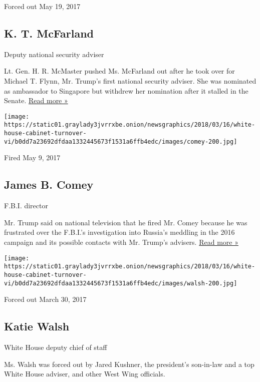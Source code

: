 Forced out May 19, 2017

\hypertarget{k-t-mcfarland}{%
\subsection{K. T. McFarland}\label{k-t-mcfarland}}

Deputy national security adviser

Lt. Gen. H. R. McMaster pushed Ms. McFarland out after he took over for
Michael T. Flynn, Mr. Trump's first national security adviser. She was
nominated as ambassador to Singapore but withdrew her nomination after
it stalled in the Senate.
\href{https://www.nytimes3xbfgragh.onion/2018/02/02/us/politics/kt-mcfarland-nomination-ambassador.html}{Read
more »}

\texttt{[image: https://static01.graylady3jvrrxbe.onion/newsgraphics/2018/03/16/white-house-cabinet-turnover-vi/b0dd7a23692dfdaa1332445673f1531a6ffb4edc/images/comey-200.jpg]}

Fired May 9, 2017

\hypertarget{james-b-comey}{%
\subsection{James B. Comey}\label{james-b-comey}}

F.B.I. director

Mr. Trump said on national television that he fired Mr. Comey because he
was frustrated over the F.B.I.'s investigation into Russia's meddling in
the 2016 campaign and its possible contacts with Mr. Trump's advisers.
\href{https://www.nytimes3xbfgragh.onion/2017/05/11/us/politics/trump-comey-showboat-fbi.html}{Read
more »}

\texttt{[image: https://static01.graylady3jvrrxbe.onion/newsgraphics/2018/03/16/white-house-cabinet-turnover-vi/b0dd7a23692dfdaa1332445673f1531a6ffb4edc/images/walsh-200.jpg]}

Forced out March 30, 2017

\hypertarget{katie-walsh}{%
\subsection{Katie Walsh}\label{katie-walsh}}

White House deputy chief of staff

Ms. Walsh was forced out by Jared Kushner, the president's son-in-law
and a top White House adviser, and other West Wing officials.

